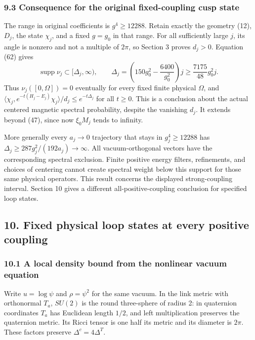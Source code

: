 \documentclass[
  11pt,
]{article}
\begin{document}
\subsubsection{9.3 Consequence for the original fixed-coupling cusp
state}\label{consequence-for-the-original-fixed-coupling-cusp-state}

The range in original coefficients is \(g^4\ge12288\). Retain exactly
the geometry (12), \(D_j\), the state \(\chi_j\), and a fixed \(g=g_0\)
in that range. For all sufficiently large \(j\), its angle is nonzero
and not a multiple of \(2\pi\), so Section 3 proves \(d_j>0\). Equation
(62) gives \[
 \operatorname{supp}\nu_j\subset[\Delta_j,\infty),\qquad
 \Delta_j=
 \left(150g_0^2-\frac{6400}{g_0^2}\right)j
 \ge\frac{7175}{48}g_0^2j .
 \tag{76}
\] Thus \(\nu_j([0,\Omega])=0\) eventually for every fixed finite
physical \(\Omega\), and
\(\langle\chi_j,e^{-t(H_j-E_j)}\chi_j\rangle/d_j
 \le e^{-t\Delta_j}\) for all \(t\ge0\). This is a conclusion about the
actual centered magnetic spectral probability, despite the vanishing
\(d_j\). It extends beyond (47), since now \(\xi_0M_j\) tends to
infinity.

More generally every \(a_j\to0\) trajectory that stays in
\(g_j^4\ge12288\) has \(\Delta_j\ge287g_j^2/(192a_j)\to\infty\). All
vacuum-orthogonal vectors have the corresponding spectral exclusion.
Finite positive energy filters, refinements, and choices of centering
cannot create spectral weight below this support for those same physical
operators. This result concerns the displayed strong-coupling interval.
Section 10 gives a different all-positive-coupling conclusion for
specified loop states.

\subsection{10. Fixed physical loop states at every positive
coupling}\label{fixed-physical-loop-states-at-every-positive-coupling}

\subsubsection{10.1 A local density bound from the nonlinear vacuum
equation}\label{a-local-density-bound-from-the-nonlinear-vacuum-equation}

Write \(u=\log\psi\) and \(\rho=\psi^2\) for the same vacuum. In the
link metric with orthonormal \(T_a\), \(SU(2)\) is the round
three-sphere of radius 2: in quaternion coordinates \(T_a\) has
Euclidean length \(1/2\), and left multiplication preserves the
quaternion metric. Its Ricci tensor is one half its metric and its
diameter is \(2\pi\). These factors preserve \(\Delta^c=4\Delta^T\).
\end{document}
